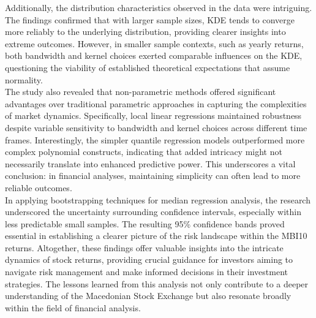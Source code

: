 \documentclass[]{article}
\begin{document}
	
	Additionally, the distribution characteristics observed in the data were intriguing. The findings confirmed that with larger sample sizes, KDE tends to converge more reliably to the underlying distribution, providing clearer insights into extreme outcomes. However, in smaller sample contexts, such as yearly returns, both bandwidth and kernel choices exerted comparable influences on the KDE, questioning the viability of established theoretical expectations that assume normality.\\
	
	
	The study also revealed that non-parametric methods offered significant advantages over traditional parametric approaches in capturing the complexities of market dynamics. Specifically, local linear regressions maintained robustness despite variable sensitivity to bandwidth and kernel choices across different time frames. Interestingly, the simpler quantile regression models outperformed more complex polynomial constructs, indicating that added intricacy might not necessarily translate into enhanced predictive power. This underscores a vital conclusion: in financial analyses, maintaining simplicity can often lead to more reliable outcomes.\\
	
	
	In applying bootstrapping techniques for median regression analysis, the research underscored the uncertainty surrounding confidence intervals, especially within less predictable small samples. The resulting 95\% confidence bands proved essential in establishing a clearer picture of the risk landscape within the MBI10 returns. Altogether, these findings offer valuable insights into the intricate dynamics of stock returns, providing crucial guidance for investors aiming to navigate risk management and make informed decisions in their investment strategies. The lessons learned from this analysis not only contribute to a deeper understanding of the Macedonian Stock Exchange but also resonate broadly within the field of financial analysis.
		
	\newpage
	
\end{document}
